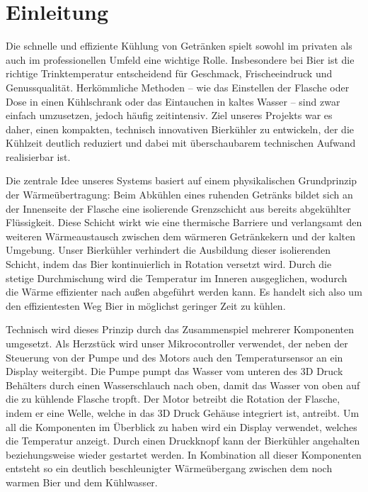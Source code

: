 \chapter{Einleitung}
\label{cha:Einleitung}



Die schnelle und effiziente Kühlung von Getränken spielt sowohl im privaten als auch im professionellen Umfeld eine wichtige Rolle. Insbesondere bei Bier ist die richtige Trinktemperatur entscheidend für Geschmack, Frischeeindruck und Genussqualität. Herkömmliche Methoden – wie das Einstellen der Flasche oder Dose in einen Kühlschrank oder das Eintauchen in kaltes Wasser – sind zwar einfach umzusetzen, jedoch häufig zeitintensiv. Ziel unseres Projekts war es daher, einen kompakten, technisch innovativen Bierkühler zu entwickeln, der die Kühlzeit deutlich reduziert und dabei mit überschaubarem technischen Aufwand realisierbar ist.

Die zentrale Idee unseres Systems basiert auf einem physikalischen Grundprinzip der Wärmeübertragung: Beim Abkühlen eines ruhenden Getränks bildet sich an der Innenseite der Flasche eine isolierende Grenzschicht aus bereits abgekühlter Flüssigkeit. Diese Schicht wirkt wie eine thermische Barriere und verlangsamt den weiteren Wärmeaustausch zwischen dem wärmeren Getränkekern und der kalten Umgebung. Unser Bierkühler verhindert die Ausbildung dieser isolierenden Schicht, indem das Bier kontinuierlich in Rotation versetzt wird. Durch die stetige Durchmischung wird die Temperatur im Inneren ausgeglichen, wodurch die Wärme effizienter nach außen abgeführt werden kann. Es handelt sich also um den effizientesten Weg Bier in möglichst geringer Zeit zu kühlen.

Technisch wird dieses Prinzip durch das Zusammenspiel mehrerer Komponenten umgesetzt. Als Herzstück wird unser Mikrocontroller verwendet, der neben der Steuerung von der Pumpe und des Motors auch den Temperatursensor an ein Display weitergibt. Die Pumpe pumpt das Wasser vom unteren des 3D Druck Behälters durch einen Wasserschlauch nach oben, damit das Wasser von oben auf die zu kühlende Flasche tropft. Der Motor betreibt die Rotation der Flasche, indem er eine Welle, welche in das 3D Druck Gehäuse integriert ist, antreibt. Um all die Komponenten im Überblick zu haben wird ein Display verwendet, welches die Temperatur anzeigt. Durch einen Druckknopf kann der Bierkühler angehalten beziehungsweise wieder gestartet werden.  In Kombination all dieser Komponenten entsteht so ein deutlich beschleunigter Wärmeübergang zwischen dem noch warmen Bier und dem Kühlwasser.

